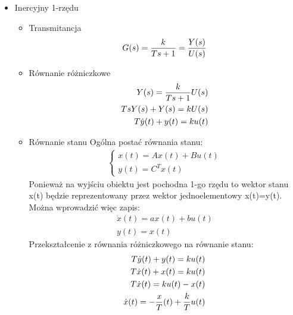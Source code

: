 \documentclass[a4paper,10pt]{article}
\begin{document}
\begin{itemize}
\item Inercyjny 1-rzędu

\begin{itemize}
\item Transmitancja	
	\begin{eqnarray}
		G(s)= {k \over {Ts + 1}} = {Y(s) \over U(s)}
	\end{eqnarray}
\item Równanie różniczkowe
	\begin{eqnarray}
		Y(s) = {k \over {Ts + 1}} U(s)\\
		\nonumber TsY(s) + Y(s) = kU(s)\\
		\nonumber T\dot{y}(t) + y(t) = ku(t)
	\end{eqnarray}
\item Równanie stanu
\newline Ogólna postać równania stanu: %
	\begin{eqnarray}
		\left\{
			\begin{array}{l}
				x(t) = Ax(t) + Bu(t)\\
				y(t) = C^{T}x(t)
			\end{array} \right.
	\end{eqnarray}
Ponieważ na wyjściu obiektu jest pochodna 1-go rzędu to wektor stanu x(t) będzie reprezentowany przez wektor jednoelementowy x(t)=y(t). Można wprowadzić więc zapis:
	\begin{eqnarray}
		\dot{x}(t) = ax(t) + bu(t)\\
		\nonumber y(t) = x(t)
	\end{eqnarray}
Przekształcenie z równania różniczkowego na równanie stanu: %
	\begin{eqnarray}
		T\dot{y}(t) + y(t) = ku(t)\\
		\nonumber T\dot{x}(t) + x(t) = ku(t)\\
		\nonumber T\dot{x}(t) = ku(t) - x(t)\\
		\nonumber \dot{x}(t) = -{x \over T}(t) + {k \over T}u(t)
	\end{eqnarray}
\end{itemize}


\end{itemize}
\end{document}
